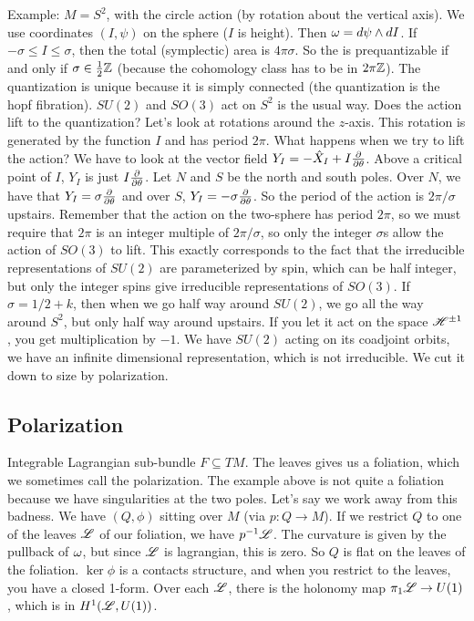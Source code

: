  Example: $M=S^2$, with the circle action (by rotation about the vertical axis).  We
 use coordinates $(I,\psi)$ on the sphere ($I$ is height).  Then $\omega=d\psi\wedge dI$.
 If $-\sigma \le I\le \sigma$, then the total (symplectic) area is $4\pi \sigma$.  So
 the is prequantizable if and only if $\sigma \in \frac{1}{2}\mathbb{Z}$ (because the
 cohomology class has to be in $2\pi\mathbb{Z}$).  The quantization is unique because it is
 simply connected (the quantization is the hopf fibration).  $SU(2)$ and $SO(3)$ act
 on $S^2$ is the usual way.  Does the action lift to the quantization? Let's look at
 rotations around the $z$-axis.  This rotation is generated by the function $I$ and
 has period $2\pi$.  What happens when we try to lift the action?  We have to look at
 the vector field $Y_I = -\hat X_I + I\frac{\partial }{\partial \theta}$.  Above a critical point of
 $I$, $Y_I$ is just $I\frac{\partial }{\partial \theta}$.  Let $N$ and $S$ be the north and south poles.
 Over $N$, we have that $Y_I=\sigma\frac{\partial }{\partial \theta}$ and over $S$, $Y_I =
 -\sigma\frac{\partial }{\partial \theta}$.  So the period of the action is $2\pi/\sigma$ upstairs.
 Remember that the action on the two-sphere has period $2\pi$, so we must require that
 $2\pi$ is an integer multiple of $2\pi/\sigma$, so only the integer $\sigma$s allow
 the action of $SO(3)$ to lift.  This exactly corresponds to the fact that the
 irreducible representations of $SU(2)$ are parameterized by spin, which can be half
 integer, but only the integer spins give irreducible representations of $SO(3)$.  If
 $\sigma=1/2+k$, then when we go half way around $SU(2)$, we go all the way around
 $S^2$, but only half way around upstairs.  If you let it act on the space $\mathscr{H}^{\pm
 1}$, you get multiplication by $-1$.  We have $SU(2)$ acting on its coadjoint orbits,
 we have an infinite dimensional representation, which is not irreducible.  We cut it
 down to size by polarization.

 \subsection*{Polarization}
 Integrable Lagrangian sub-bundle $F\subseteq TM$.  The leaves gives us a foliation,
 which we sometimes call the polarization.  The example above is not quite a foliation
 because we have singularities at the two poles.  Let's say we work away from this
 badness.  We have $(Q,\phi)$ sitting over $M$ (via $p:Q\to M$).  If we restrict $Q$
 to one of the leaves $\mathscr{L}$ of our foliation, we have $p^{-1}\mathscr{L}$.  The curvature is given
 by the pullback of $\omega$, but since $\mathscr{L}$ is lagrangian, this is zero.  So $Q$ is flat
 on the leaves of the foliation.  $\ker\phi$ is a contacts structure, and when you
 restrict to the leaves, you have a closed 1-form.  Over each $\mathscr{L}$, there is the
 holonomy map $\pi_1 \mathscr{L}\to U(1)$, which is in $H^1(\mathscr{L},U(1))$.


